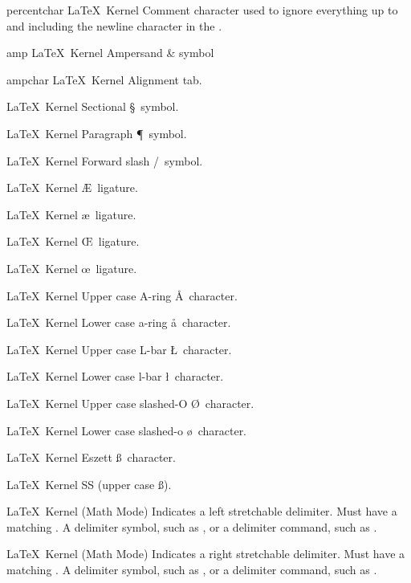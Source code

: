  {percentchar}
 {\percentsym}
 {}
 {\LaTeX\ Kernel}
 {Comment character used to ignore everything up to and including
  the newline character in the .}
 {}

 {amp}
 {\ampsym}
 {}
 {\LaTeX\ Kernel}
 {Ampersand \& symbol}
 {}

 {ampchar}
 {\ampsym}
 {}
 {\LaTeX\ Kernel}
 {Alignment tab.}
 {}

%
 {}%
 {\LaTeX\ Kernel}%
 {Sectional \S\ symbol.}%
 {}

%
 {}%
 {\LaTeX\ Kernel}%
 {Paragraph \P\ symbol.}%
 {}

%
 {}%
 {\LaTeX\ Kernel}%
 {Forward slash \slash\ symbol.}%
 {}

%
 {}%
 {\LaTeX\ Kernel}%
 {\protect\AE\ ligature.}%
 {}

%
 {}%
 {\LaTeX\ Kernel}%
 {\protect\ae\ ligature.}%
 {}

%
 {}%
 {\LaTeX\ Kernel}%
 {\protect\OE\ ligature.}%
 {}

%
 {}%
 {\LaTeX\ Kernel}%
 {\protect\oe\ ligature.}%
 {}

%
 {}%
 {\LaTeX\ Kernel}%
 {Upper case A-ring \AA\ character.}%
 {}

%
 {}%
 {\LaTeX\ Kernel}%
 {Lower case a-ring \aa\ character.}%
 {}

%
 {}%
 {\LaTeX\ Kernel}%
 {Upper case L-bar \L\ character.}%
 {}

%
 {}%
 {\LaTeX\ Kernel}%
 {Lower case l-bar \l\ character.}%
 {}

%
 {}%
 {\LaTeX\ Kernel}%
 {Upper case slashed-O \O\ character.}%
 {}

%
 {}%
 {\LaTeX\ Kernel}%
 {Lower case slashed-o \o\ character.}%
 {}

%
 {}%
 {\LaTeX\ Kernel}%
 {Eszett \ss\ character.}%
 {}

%
 {}%
 {\LaTeX\ Kernel}%
 {SS (upper case \ss).}%
 {}

 {}
 {\LaTeX\ Kernel (Math Mode)}
 {Indicates a left stretchable delimiter. Must have a matching
  .}
 {%
   \BeginArgList
     A delimiter symbol, such as
    , or a delimiter command, such as .
   \EndArgList
 }

 {}
 {\LaTeX\ Kernel (Math Mode)}
 {Indicates a right stretchable delimiter. Must have a matching
  .}
 {%
   \BeginArgList
     A delimiter symbol, such as
    , or a delimiter command, such as .
   \EndArgList
 }

